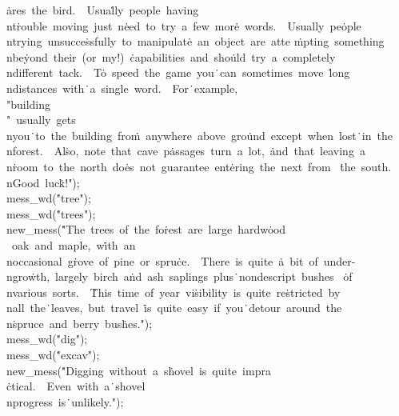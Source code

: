 \.{ares\ the\ bird.\ \ Usua}\)\.{lly\ people\ having\\nt}\)\.{rouble\ moving\
just\ n}\)\.{eed\ to\ try\ a\ few\ mor}\)\.{e\ words.\ \ Usually\ pe}\)\.{ople%
\\ntrying\ unsucce}\)\.{ssfully\ to\ manipulat}\)\.{e\ an\ object\ are\ atte}\)%
\.{mpting\ something\\nbe}\)\.{yond\ their\ (or\ my!)\ }\)\.{capabilities\ and\
sho}\)\.{uld\ try\ a\ completely}\)\.{\\ndifferent\ tack.\ \ T}\)\.{o\ speed\
the\ game\ you}\)\.{\ can\ sometimes\ move\ }\)\.{long\\ndistances\ with}\)\.{\
a\ single\ word.\ \ For}\)\.{\ example,\ \\"building}\)\.{\\"\ usually\ gets%
\\nyou}\)\.{\ to\ the\ building\ fro}\)\.{m\ anywhere\ above\ gro}\)\.{und\
except\ when\ lost}\)\.{\ in\ the\\nforest.\ \ Al}\)\.{so,\ note\ that\ cave\
p}\)\.{assages\ turn\ a\ lot,\ }\)\.{and\ that\ leaving\ a\\n}\)\.{room\ to\
the\ north\ do}\)\.{es\ not\ guarantee\ ent}\)\.{ering\ the\ next\ from\ }\)%
\.{the\ south.\\nGood\ luc}\)\.{k!"});\6
\\{mess\_wd}(\.{"tree"});\5
\\{mess\_wd}(\.{"trees"});\6
\\{new\_mess}(\.{"The\ trees\ of\ the\ fo}\)\.{rest\ are\ large\ hardw}\)\.{ood%
\ oak\ and\ maple,\ w}\)\.{ith\ an\\noccasional\ g}\)\.{rove\ of\ pine\ or\
spru}\)\.{ce.\ \ There\ is\ quite\ }\)\.{a\ bit\ of\ under-\\ngro}\)\.{wth,\
largely\ birch\ a}\)\.{nd\ ash\ saplings\ plus}\)\.{\ nondescript\ bushes\ }\)%
\.{of\\nvarious\ sorts.\ \ }\)\.{This\ time\ of\ year\ vi}\)\.{sibility\ is\
quite\ re}\)\.{stricted\ by\\nall\ the}\)\.{\ leaves,\ but\ travel\ }\)\.{is\
quite\ easy\ if\ you}\)\.{\ detour\ around\ the\\n}\)\.{spruce\ and\ berry\
bus}\)\.{hes."});\6
\\{mess\_wd}(\.{"dig"});\5
\\{mess\_wd}(\.{"excav"});\6
\\{new\_mess}(\.{"Digging\ without\ a\ s}\)\.{hovel\ is\ quite\ impra}\)%
\.{ctical.\ \ Even\ with\ a}\)\.{\ shovel\\nprogress\ is}\)\.{\ unlikely."});\6
